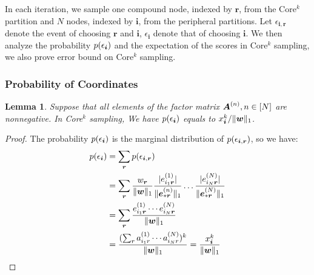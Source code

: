\documentclass[10pt,journal,compsoc]{IEEEtran}
\newcommand{\Sca}[3]{{#1}^{(#2)}_{i_#2#3}}%
\newcommand{\anr}[2]{\Sca{a}{#1}{#2}}
\newcommand{\V}[1]{{\boldsymbol{{\MakeLowercase{#1}}}}}
\newcommand{\ColVec}[3]{\V{#1}^{(#2)}_{#3}}
\newcommand{\M}[1]{{\boldsymbol{{\MakeUppercase{#1}}}}}
\newcommand{\norm}[2]{\|#1\|_{#2}}
\newtheorem{lemma}{Lemma}
\begin{document}
In each iteration, 
we sample one compound node, indexed by $\boldsymbol{r}$, 
from the Core$^k$ partition and $N$ nodes, 
indexed by $\boldsymbol{i}$, from the peripheral partitions. 
Let $\epsilon_{\boldsymbol{i},\boldsymbol{r}}$ 
denote the event of choosing $\boldsymbol{r}$ 
and $\boldsymbol{i}$, $\epsilon_{\boldsymbol{i}}$ denote that of choosing $\boldsymbol{i}$.
We then analyze the probability $p(\epsilon_{\V{i}})$ and the expectation of the scores in Core$^k$ sampling, we also prove error bound on Core$^k$ sampling.

\subsubsection{Probability of Coordinates}
\begin{lemma}\label{lem:Probability}
	Suppose that all elements of the factor matrix $\M{A}^{(n)}, n\in[N]$ are nonnegative. 
	In Core$^k$ sampling, We have $p(\epsilon_{\V{i}})$ equals to $x^k_{\V{i}}/\norm{\V{w}}{1}$.
\end{lemma}
\begin{proof}
	The probability $p(\epsilon_{\V{i}})$ is the marginal distribution of $p(\epsilon_{\V{i},\V{r}})$,
	so we have:
	\begin{align*}
	p(\epsilon_{\V{i}})
	& = \sum_{\V{r}} p(\epsilon_{\V{i},\V{r}}) \\
	& = \sum_{\V{r}} \frac{w_{\V{r}}}{\norm{\V{W}}{1}}
	\frac{|\Sca{e}{1}{\V{r}}|}{\norm{\ColVec{e}{n}{*\V{r}}}{1}}\ldots\frac{|\Sca{e}{N}{\V{r}}|}{\norm{\ColVec{e}{N}{*\V{r}}}{1}}\\
	& = \sum_{\V{r}} \frac{\Sca{e}{1}{\V{r}}\cdots\Sca{e}{N}{\V{r}}}{\norm{\V{W}}{1}}\\
	& = \frac{(\sum_{r}\anr{1}{r}\cdots\anr{N}{r})^k}{\norm{\V{W}}{1}}
	= \frac{x^k_{\V{i}}}{\norm{\V{w}}{1}}
	\end{align*}
\end{proof}
\end{document}

